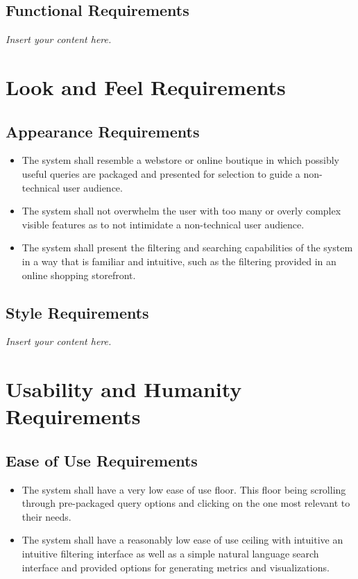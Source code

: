 \documentclass[12pt]{article}
\newcommand{\lips}{\textit{Insert your content here.}}
\begin{document}
\subsection{Functional Requirements}
\lips

\section{Look and Feel Requirements}



\subsection{Appearance Requirements}

\begin{itemize}
    \item The system shall resemble a webstore or online boutique in which possibly useful queries are packaged and presented for selection to guide 
    a non-technical user audience.
    \item The system shall not overwhelm the user with too many or overly complex visible features as to not intimidate a non-technical user audience.
    \item The system shall present the filtering and searching capabilities of the system in a way that is familiar and intuitive, such as the 
    filtering provided in an online shopping storefront.
\end{itemize}

\subsection{Style Requirements}
\lips

\section{Usability and Humanity Requirements}



\subsection{Ease of Use Requirements}

\begin{itemize}
    \item The system shall have a very low ease of use floor. This floor being scrolling through
    pre-packaged query options and clicking on the one most relevant to their needs.
    \item The system shall have a reasonably low ease of use ceiling with intuitive an intuitive filtering interface
    as well as a simple natural language search interface and provided options for generating metrics and visualizations.
\end{itemize}
\end{document}
